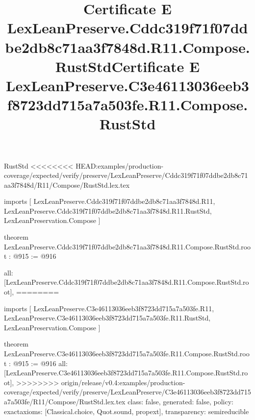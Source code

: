 \begin{lexlean}{RustStd}
<<<<<<<< HEAD:examples/production-coverage/expected/verify/preserve/LexLeanPreserve/Cddc319f71f07ddbe2db8c71aa3f7848d/R11/Compose/RustStd.lex.tex
\title{Certificate E LexLeanPreserve.Cddc319f71f07ddbe2db8c71aa3f7848d.R11.Compose.RustStd}
\begin{coremodule}
imports [
  LexLeanPreserve.Cddc319f71f07ddbe2db8c71aa3f7848d.R11,
  LexLeanPreserve.Cddc319f71f07ddbe2db8c71aa3f7848d.R11.RustStd,
  LexLeanPreservation.Compose
]

theorem LexLeanPreserve.Cddc319f71f07ddbe2db8c71aa3f7848d.R11.Compose.RustStd.root : @915 := @916 {
  all: [LexLeanPreserve.Cddc319f71f07ddbe2db8c71aa3f7848d.R11.Compose.RustStd.root],
========
\title{Certificate E LexLeanPreserve.C3e46113036eeb3f8723dd715a7a503fe.R11.Compose.RustStd}
\begin{coremodule}
imports [
  LexLeanPreserve.C3e46113036eeb3f8723dd715a7a503fe.R11,
  LexLeanPreserve.C3e46113036eeb3f8723dd715a7a503fe.R11.RustStd,
  LexLeanPreservation.Compose
]

theorem LexLeanPreserve.C3e46113036eeb3f8723dd715a7a503fe.R11.Compose.RustStd.root : @915 := @916 {
  all: [LexLeanPreserve.C3e46113036eeb3f8723dd715a7a503fe.R11.Compose.RustStd.root],
>>>>>>>> origin/release/v0.4:examples/production-coverage/expected/verify/preserve/LexLeanPreserve/C3e46113036eeb3f8723dd715a7a503fe/R11/Compose/RustStd.lex.tex
  class: false,
  generated: false,
  policy: exact{axioms: [Classical.choice, Quot.sound, propext]},
  transparency: semireducible
}


\end{coremodule}}
\end{coremodule}
\end{lexlean}
